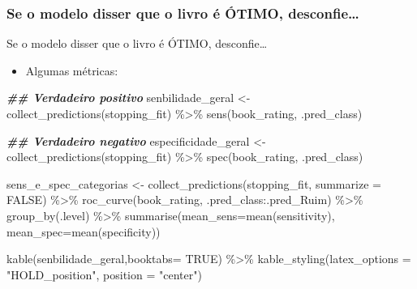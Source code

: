 \documentclass[
  9 pt,
  ignorenonframetext,
]{beamer}
\newenvironment{Shaded}{\begin{snugshade}}{\end{snugshade}}
\newcommand{\AttributeTok}[1]{\textcolor[rgb]{0.77,0.63,0.00}{#1}}
\newcommand{\ConstantTok}[1]{\textcolor[rgb]{0.00,0.00,0.00}{#1}}
\newcommand{\DocumentationTok}[1]{\textcolor[rgb]{0.56,0.35,0.01}{\textbf{\textit{#1}}}}
\newcommand{\FunctionTok}[1]{\textcolor[rgb]{0.00,0.00,0.00}{#1}}
\newcommand{\NormalTok}[1]{#1}
\newcommand{\OtherTok}[1]{\textcolor[rgb]{0.56,0.35,0.01}{#1}}
\newcommand{\SpecialCharTok}[1]{\textcolor[rgb]{0.00,0.00,0.00}{#1}}
\newcommand{\StringTok}[1]{\textcolor[rgb]{0.31,0.60,0.02}{#1}}
\providecommand{\tightlist}{%
  \setlength{\itemsep}{0pt}\setlength{\parskip}{0pt}}
\begin{document}
\hypertarget{se-o-modelo-disser-que-o-livro-uxe9-uxf3timo-desconfie}{%
\subsubsection{Se o modelo disser que o livro é ÓTIMO,
desconfie\ldots{}}\label{se-o-modelo-disser-que-o-livro-uxe9-uxf3timo-desconfie}}

\begin{frame}[fragile]{Se o modelo disser que o livro é ÓTIMO,
desconfie\ldots{}}
\begin{itemize}
\tightlist
\item
  Algumas métricas:
\end{itemize}

\begin{Shaded}
\begin{Highlighting}[]
\DocumentationTok{\#\# Verdadeiro positivo}
\NormalTok{senbilidade\_geral }\OtherTok{\textless{}{-}} \FunctionTok{collect\_predictions}\NormalTok{(stopping\_fit) }\SpecialCharTok{\%\textgreater{}\%} 
  \FunctionTok{sens}\NormalTok{(book\_rating, .pred\_class)}

\DocumentationTok{\#\# Verdadeiro negativo}
\NormalTok{especificidade\_geral }\OtherTok{\textless{}{-}} \FunctionTok{collect\_predictions}\NormalTok{(stopping\_fit) }\SpecialCharTok{\%\textgreater{}\%} 
  \FunctionTok{spec}\NormalTok{(book\_rating, .pred\_class)}

\NormalTok{sens\_e\_spec\_categorias }\OtherTok{\textless{}{-}} \FunctionTok{collect\_predictions}\NormalTok{(stopping\_fit, }\AttributeTok{summarize =} \ConstantTok{FALSE}\NormalTok{) }\SpecialCharTok{\%\textgreater{}\%}
  \FunctionTok{roc\_curve}\NormalTok{(book\_rating, .pred\_class}\SpecialCharTok{:}\NormalTok{.pred\_Ruim) }\SpecialCharTok{\%\textgreater{}\%} 
  \FunctionTok{group\_by}\NormalTok{(.level) }\SpecialCharTok{\%\textgreater{}\%} 
  \FunctionTok{summarise}\NormalTok{(}\AttributeTok{mean\_sens=}\FunctionTok{mean}\NormalTok{(sensitivity),}
            \AttributeTok{mean\_spec=}\FunctionTok{mean}\NormalTok{(specificity))}

\FunctionTok{kable}\NormalTok{(senbilidade\_geral,}\AttributeTok{booktabs=} \ConstantTok{TRUE}\NormalTok{) }\SpecialCharTok{\%\textgreater{}\%} 
  \FunctionTok{kable\_styling}\NormalTok{(}\AttributeTok{latex\_options =} \StringTok{"HOLD\_position"}\NormalTok{, }\AttributeTok{position =} \StringTok{"center"}\NormalTok{)}
\end{Highlighting}
\end{Shaded}


\end{frame}
\end{document}
